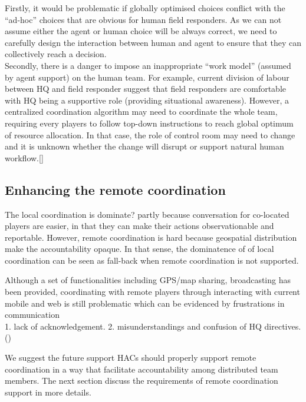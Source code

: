 Firstly, it would be problematic if globally optimised choices conflict with the ``ad-hoc'' choices that are obvious for human field responders. As we can not assume either the agent or human choice will be always correct, we need to carefully design the interaction between human and agent to ensure that they can collectively reach a decision.\\

Secondly, there is a danger to impose an inappropriate ``work model'' (assumed by agent support) on the human team. For example, current division of labour between HQ and field responder suggest that field responders are comfortable with HQ being a supportive role (providing situational awareness). However, a centralized coordination algorithm may need to coordinate the whole team, requiring every players to follow top-down instructions to reach global optimum of resource allocation. In that case, the role of control room may need to change and it is unknown whether the change will disrupt or support natural human workflow.[] \\

\subsection{Enhancing the remote coordination}

The local coordination is dominate? partly because conversation for co-located players are easier, in that they can make their actions observationable and reportable. However, remote coordination is hard because geospatial distribution make the accountability opaque. In that sense, the dominatence of of local coordination can be seen as fall-back when remote coordination is not supported. 

Although a set of functionalities including GPS/map sharing, broadcasting has been provided, coordinating with remote players through interacting with current mobile and web is still problematic which can be evidenced by frustrations in communication\\

1. lack of acknowledgement. 
2. misunderstandings and confusion of HQ directives. ()

We suggest the future support HACs should properly support remote coordination in a way that facilitate accountability among distributed team members. The next section discuss the  requirements of remote coordination support in more details. 

